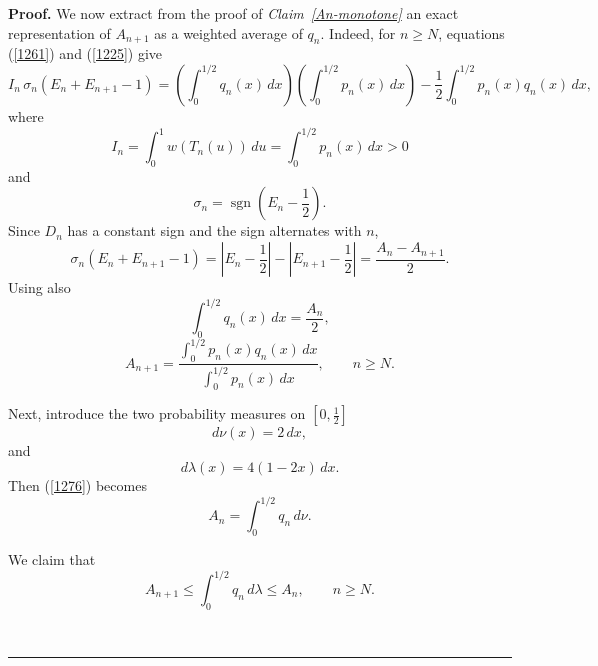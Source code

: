 \documentclass[onecolumn]{article}
\providecommand{\func}[1]{\operatorname{#1}}
\newenvironment{proof}[1][Proof]{\noindent\textbf{#1.} }{\ \rule{0.5em}{0.5em}}
\begin{document}
\begin{proof}
We now extract from the proof of \textit{Claim~\ref{An-monotone}} an exact
representation of $A_{n+1}$ as a weighted average of $q_{n}$. Indeed, for $%
n\geq N$, equations (\ref{1261}) and (\ref{1225}) give 
\begin{equation}
I_{n}\,\sigma _{n}(E_{n}+E_{n+1}-1)=\left( \int_{0}^{1/2}q_{n}(x)\,dx\right)
\left( \int_{0}^{1/2}p_{n}(x)\,dx\right) -\frac{1}{2}%
\int_{0}^{1/2}p_{n}(x)q_{n}(x)\,dx,  \label{1277}
\end{equation}%
where 
\begin{equation}
I_{n}=\int_{0}^{1}w(T_{n}(u))\,du=\int_{0}^{1/2}p_{n}(x)\,dx>0  \label{1278}
\end{equation}%
and 
\begin{equation}
\sigma _{n}=\func{sgn}\!\left( E_{n}-\frac{1}{2}\right) .  \label{1279}
\end{equation}%
Since $D_{n}$ has a constant sign and the sign alternates with $n$, 
\begin{equation}
\sigma _{n}(E_{n}+E_{n+1}-1)=\left\vert E_{n}-\frac{1}{2}\right\vert
-\left\vert E_{n+1}-\frac{1}{2}\right\vert =\frac{A_{n}-A_{n+1}}{2}.
\label{1280}
\end{equation}%
Using also 
\begin{equation}
\int_{0}^{1/2}q_{n}(x)\,dx=\frac{A_{n}}{2},  \label{1281}
\end{equation}%
\begin{equation}
A_{n+1}=\frac{\int_{0}^{1/2}p_{n}(x)q_{n}(x)\,dx}{\int_{0}^{1/2}p_{n}(x)\,dx}%
,\qquad n\geq N.  \label{1282}
\end{equation}

Next, introduce the two probability measures on $[0,\tfrac{1}{2}]$ 
\begin{equation}
d\nu (x)=2\,dx,  \label{1283}
\end{equation}%
and 
\begin{equation}
d\lambda (x)=4(1-2x)\,dx.  \label{1284}
\end{equation}%
Then (\ref{1276}) becomes 
\begin{equation}
A_{n}=\int_{0}^{1/2}q_{n}\,d\nu .  \label{1285}
\end{equation}

We claim that 
\begin{equation}
A_{n+1}\leq \int_{0}^{1/2}q_{n}\,d\lambda \leq A_{n},\qquad n\geq N.
\label{1286}
\end{equation}


\end{proof}
\end{document}

